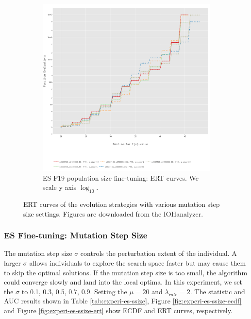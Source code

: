\documentclass{article}
\begin{document}
\begin{figure}[!ht]
\begin{subfigure}[h]{0.95\linewidth}
        \includegraphics[width=\linewidth]{es/f19/ERT19ps.png}
        \caption{ES F19 population size fine-tuning: ERT curves. We scale y axis $\log_{10}$.}
    \end{subfigure}
    \caption{ERT curves of the evolution strategies with various mutation step size settings. Figures are downloaded from the IOHanalyzer.}
    \label{fig:experi-es-psize-ert}
\end{figure}

\subsubsection{ES Fine-tuning: Mutation Step Size}

The mutation step size $\sigma$ controls the perturbation extent of the individual. A larger $\sigma$ allows individuals to explore the search space faster but may cause them to skip the optimal solutions. If the mutation step size is too small, the algorithm could converge slowly and land into the local optima. In this experiment, we set the $\sigma$ to 0.1, 0.3, 0.5, 0.7, 0.9. Setting the $\mu = 20$ and $\lambda_{rate} = 2$. The statistic and AUC results shown in Table \ref{tab:experi-es-ssize}, Figure \ref{fig:experi-es-ssize-ecdf} and Figure \ref{fig:experi-es-ssize-ert} show ECDF and ERT curves, respectively.
\end{document}
